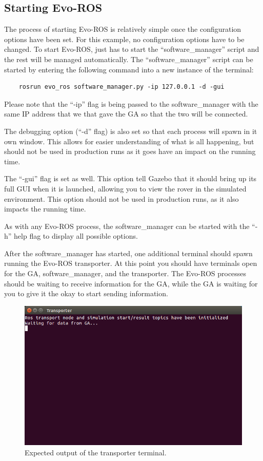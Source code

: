\documentclass{report}
\begin{document}
\subsection{Starting Evo-ROS}
The process of starting Evo-ROS is relatively simple once the configuration options have been set. For this example, no configuration options have to be changed. To start Evo-ROS, just has to start the ``software\_manager'' script and the rest will be managed automatically. The 	``software\_manager'' script can be started by entering the following command into a new instance of the terminal:
\begin{lstlisting}
	rosrun evo_ros software_manager.py -ip 127.0.0.1 -d -gui
\end{lstlisting}

Please note that the ``-ip'' flag is being passed to the software\_manager with the same IP address that we that gave the GA so that the two will be connected. 

The debugging option (``-d'' flag) is also set so that each process will spawn in it own window. This allows for easier understanding of what is all happening, but should not be used in production runs as it goes have an impact on the running time.

The ``-gui'' flag is set as well. This option tell Gazebo that it should bring up its full GUI when it is launched, allowing you to view the rover in the simulated environment. This option should not be used in production runs, as it also impacts the running time.

As with any Evo-ROS process, the software\_manager can be started with the ``-h'' help flag to display all possible options.

After the software\_manager has started, one additional terminal should spawn running the Evo-ROS transporter. At this point you should have terminals open for the GA, software\_manager, and the transporter. The Evo-ROS processes should be waiting to receive information for the GA, while the GA is waiting for you to give it the okay to start sending information.



\begin{figure}[h]
	\centering
 	\includegraphics[scale=0.33]{Images/transporter_term_image.png}
 	\caption{Expected output of the transporter terminal.}
 	\label{transporter_term_image}
\end{figure}
 
\end{document}
